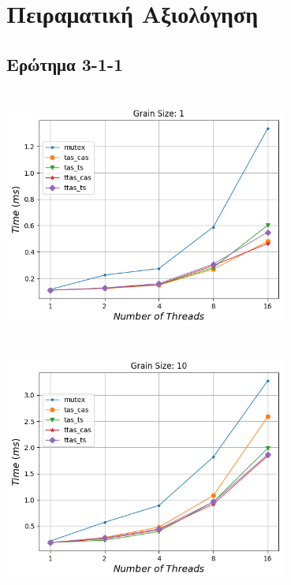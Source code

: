 \section{Πειραματική Αξιολόγηση}
\subsection{Ερώτημα 3-1-1}

\begin{minipage}{\textwidth}
   \begin{center}
      \\
      \vspace{3mm}
      \includegraphics[width=0.7\textwidth, frame]{./graphs/time/grain-1.png}
      \vspace{6mm}
   \end{center}
\end{minipage}

\begin{minipage}{\textwidth}
   \begin{center}
      \\
      \vspace{3mm}
      \includegraphics[width=0.7\textwidth, frame]{./graphs/time/grain-10.png}
      \vspace{6mm}
   \end{center}
\end{minipage}

